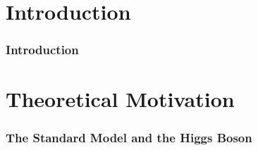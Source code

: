 \documentclass[NOTE, atlasdraft=true, texlive=2016, UKenglish]{\ATLASLATEXPATH atlasdoc}
\begin{document}
\maketitle

\begin{singlespace}
\tableofcontents
\end{singlespace}

\clearpage

\part{Introduction}
\label{part:intro}


\section{Introduction}
\label{sec:intro}


\part{Theoretical Motivation}
\label{part:theory}


\section{The Standard Model and the Higgs Boson}
\label{sec:sm}



%

\end{document}

